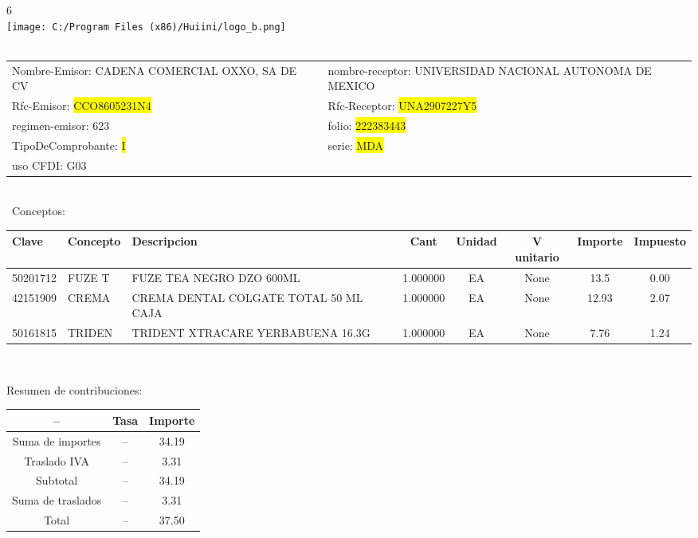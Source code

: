 \documentclass{article}
\begin{document}
\hspace{18cm} 6\\
\texttt{[image: C:/Program Files (x86)/Huiini/logo\_b.png]}
\bigskip\\\
\begin{tabular}{p{11cm}p{1cm}p{8cm}}

Nombre-Emisor: CADENA COMERCIAL OXXO, SA DE CV && nombre-receptor: UNIVERSIDAD NACIONAL AUTONOMA DE MEXICO\\

Rfc-Emisor: \colorbox{yellow}{ CCO8605231N4 } & & Rfc-Receptor: \colorbox{yellow}{ UNA2907227Y5 }\\

regimen-emisor: 623 & & folio: \colorbox{yellow}{ 222383443 }\\

TipoDeComprobante: \colorbox{yellow}{ I } & & serie: \colorbox{yellow}{ MDA }\\

uso CFDI: G03\\



\end{tabular}
\bigskip\bigskip\bigskip\\\
Conceptos:\\
\begin{tabular}{|p{1.5cm}|p{3.6cm}|p{3.6cm}|c|c|c|c|c|}
\hline
Clave & Concepto & Descripcion & Cant & Unidad & V unitario & Importe & Impuesto \\
\hline

50201712 & FUZE T & FUZE TEA NEGRO DZO 600ML & 1.000000 & EA & None & 13.5 &  0.00 \\
\hline

42151909 & CREMA  & CREMA DENTAL COLGATE TOTAL 50 ML CAJA & 1.000000 & EA & None & 12.93 &  2.07 \\
\hline

50161815 & TRIDEN & TRIDENT XTRACARE YERBABUENA 16.3G & 1.000000 & EA & None & 7.76 &  1.24 \\
\hline

\end{tabular}\\
\bigskip
\begin{center}
Resumen de contribuciones:\\
\bigskip
\begin{tabular}{|c|c|c|}
\hline
 -- & Tasa & Importe\\
\hline

Suma de importes & -- & 34.19 \\
\hline

Traslado IVA & -- & 3.31 \\
\hline

Subtotal  & -- & 34.19 \\
\hline

Suma de traslados & -- & 3.31 \\
\hline

Total  & -- & 37.50 \\
\hline

\end{tabular}
\end{center}
\end{document}
